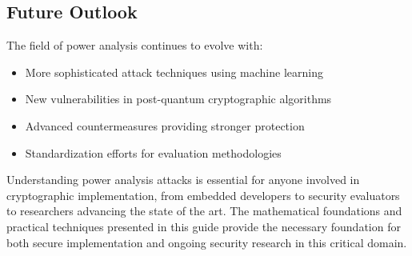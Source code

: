 \documentclass[11pt,a4paper]{article}
\theoremstyle{definition}
\begin{document}
\subsection{Future Outlook}

The field of power analysis continues to evolve with:
\begin{itemize}
    \item More sophisticated attack techniques using machine learning
    \item New vulnerabilities in post-quantum cryptographic algorithms
    \item Advanced countermeasures providing stronger protection
    \item Standardization efforts for evaluation methodologies
\end{itemize}

Understanding power analysis attacks is essential for anyone involved in cryptographic implementation, from embedded developers to security evaluators to researchers advancing the state of the art. The mathematical foundations and practical techniques presented in this guide provide the necessary foundation for both secure implementation and ongoing security research in this critical domain.

\newpage
\end{document}
